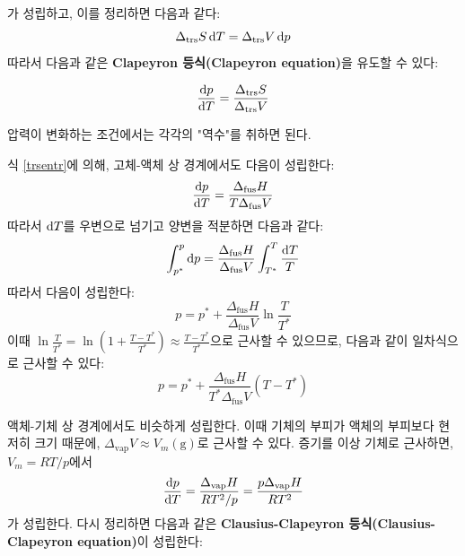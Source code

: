         가 성립하고, 이를 정리하면 다음과 같다:
        \begin{equation*}
            \Delta_\mathrm{trs} S \operatorname{d\!} T = \Delta_\mathrm{trs}V\operatorname{d\!} p
        \end{equation*}
        따라서 다음과 같은 \textbf{Clapeyron 등식(Clapeyron equation)}을 유도할 수 있다:
        \begin{law}[Clapeyron 등식]
        \begin{equation*}
            \frac{\operatorname{d\!} p}{\operatorname{d\!} T} = \frac{\Delta_\mathrm{trs}S}{\Delta_\mathrm{trs}V}
        \end{equation*}
        \end{law}
        압력이 변화하는 조건에서는 각각의 "역수"를 취하면 된다.
        \par 식 \ref{trsentr}에 의해, 고체-액체 상 경계에서도 다음이 성립한다:
        \begin{equation*}
            \frac{\operatorname{d\!} p}{\operatorname{d\!} T} = \frac{\Delta_\mathrm{fus}H}{T \Delta_\mathrm{fus}V}
        \end{equation*}
        따라서 $\operatorname{d\!} T$를 우변으로 넘기고 양변을 적분하면 다음과 같다:
        \begin{equation*}
            \int_{p^\ast}^{p}\operatorname{d\!} p = \frac{\Delta_\mathrm{fus}H}{\Delta_\mathrm{fus}V}\int_{T^\ast}^{T}\frac{\operatorname{d\!} T}{T}
        \end{equation*}
        따라서 다음이 성립한다:
        \begin{equation*}
            p = p^\ast + \frac{\Delta_\mathrm{fus}H}{\Delta_\mathrm{fus}V}\ln{\frac{T}{T^\ast}}
        \end{equation*}
        이때 $\displaystyle \ln{\frac{T}{T^\ast}} = \ln{\left(1+\frac{T-T^\ast}{T^\ast}\right)}\approx \frac{T-T^\ast}{T^\ast}$으로 근사할 수 있으므로, 
        다음과 같이 일차식으로 근사할 수 있다:
        \begin{equation*}
            p = p^\ast + \frac{\Delta_\mathrm{fus}H}{T^\ast \Delta_\mathrm{fus}V}\left(T-T^\ast \right)
        \end{equation*}
        \par 액체-기체 상 경계에서도 비슷하게 성립한다. 이때 기체의 부피가 액체의 부피보다 현저히 크기 때문에, $\Delta_\mathrm{vap}V \approx V_m\left(\mathrm{g}\right)$로 
        근사할 수 있다. 증기를 이상 기체로 근사하면, $V_m = RT/p$에서 
        $$
        \frac{\operatorname{d\!} p}{\operatorname{d\!} T} = \frac{\Delta_\mathrm{vap}H}{RT^2 /p}=\frac{p\Delta_\mathrm{vap}H}{RT^2}
        $$
        가 성립한다. 다시 정리하면 다음과 같은 \textbf{Clausius-Clapeyron 등식(Clausius-Clapeyron equation)}이 성립한다:
